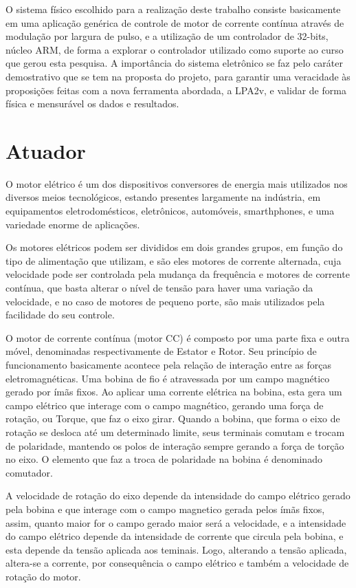 O sistema físico escolhido para a realização deste trabalho
consiste basicamente em uma aplicação genérica de controle de motor de 
corrente contínua através de modulação por largura de pulso, 
e a utilização de um controlador de 32-bits, núcleo ARM, 
de forma a explorar o controlador utilizado como suporte ao 
curso que gerou esta pesquisa. A importância do sistema eletrônico se faz 
pelo caráter demostrativo que se tem na proposta do projeto, 
para garantir uma veracidade às proposições feitas com a 
nova ferramenta abordada, a LPA2v, 
e validar de forma física e mensurável os dados e resultados.



\section{Atuador}

O motor elétrico é um dos dispositivos 
conversores de energia mais utilizados nos 
diversos meios tecnológicos, 
estando presentes largamente na indústria, 
em equipamentos eletrodomésticos, 
eletrônicos, automóveis, smarthphones, 
e uma variedade enorme de aplicações. 

Os motores elétricos podem ser divididos em dois grandes grupos, 
em função do tipo de alimentação que utilizam, e são eles 
motores de corrente alternada, 
cuja velocidade pode ser controlada pela mudança da frequência e 
motores de corrente contínua, 
que basta alterar o nível de tensão para haver uma variação da velocidade, 
e no caso de motores de pequeno porte, 
são mais utilizados pela facilidade do seu controle. 

O motor de corrente contínua (motor CC) %
é composto por uma parte fixa e outra móvel, 
denominadas respectivamente de Estator e Rotor. 
Seu princípio de funcionamento basicamente acontece pela 
relação de interação entre as forças eletromagnéticas. 
Uma bobina de fio é atravessada por um campo magnético 
gerado por ímãs fixos. 
Ao aplicar uma corrente elétrica na bobina, 
esta gera um campo elétrico que interage com o campo magnético, 
gerando uma força de rotação, ou Torque, que faz o eixo girar. 
Quando a bobina, 
que forma o eixo de rotação se desloca até um determinado limite, 
seus terminais comutam e trocam de polaridade, 
mantendo os polos de interação sempre gerando a força de torção no eixo. 
O elemento que faz a troca de polaridade na bobina é denominado comutador.

A velocidade de rotação do eixo depende 
da intensidade do campo elétrico gerado pela bobina 
e que interage com o campo magnetico gerada pelos ímãs fixos, 
assim, quanto maior for o campo gerado 
maior será a velocidade, 
e a intensidade do campo elétrico depende da 
intensidade de corrente que circula pela bobina, 
e esta depende da tensão aplicada aos teminais. 
Logo, alterando a tensão aplicada, altera-se a corrente, 
por consequência o campo elétrico e também a velocidade de rotação do motor.

